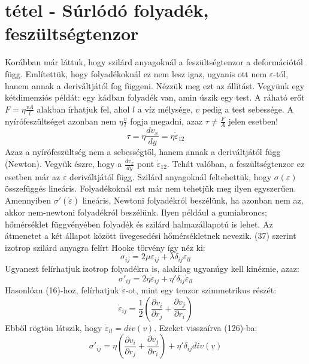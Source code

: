 \documentclass[a4paper,12pt]{article}
\begin{document}
\section{tétel - Súrlódó folyadék, feszültségtenzor}
Korábban már láttuk, hogy szilárd anyagoknál a feszültségtenzor a deformációtól függ. Említettük, hogy folyadékoknál ez nem lesz igaz, ugyanis ott nem $\varepsilon$-tól, hanem annak a deriváltjától fog függeni. Nézzük meg ezt az állítást.
Vegyünk egy kétdimenziós példát: egy kádban folyadék van, amin úszik egy test. A ráható erőt $F=\eta\frac{vA}{l}$ alakban írhatjuk fel, ahol $l$ a víz mélysége, $v$ pedig a test sebessége. A nyírófeszültséget azonban nem $\eta\frac{v}{l}$ fogja megadni, azaz $\tau\neq\frac{F}{A}$ jelen esetben!
\begin{equation}
\tau=\eta\frac{dv_x}{dy}=\eta\dot{\varepsilon}_{12}
\end{equation}
Azaz a nyírófeszültség nem a sebességtől, hanem annak a deriváltjától függ (Newton). Vegyük észre, hogy a $\frac{dv_x}{dy}$ pont $\dot{\varepsilon}_{12}$. Tehát valóban, a feszültségtenzor ez esetben már az $\varepsilon$ deriváltjától függ.
Szilárd anyagoknál feltehettük, hogy $\sigma(\varepsilon)$ összefüggés lineáris. Folyadékoknál ezt már nem tehetjük meg ilyen egyszerűen. Amennyiben $\sigma'(\dot{\varepsilon})$ lineáris, Newtoni folyadékról beszélünk, ha azonban nem az, akkor nem-newtoni folyadékról beszélünk. Ilyen például a gumiabroncs; hőmérséklet függvényében folyadék és szilárd halmazállapotú is lehet. Az átmenetet a két állapot között üvegesedési hőmérsékletnek nevezik.
(37) szerint izotrop szilárd anyagra felírt Hooke törvény így néz ki:
\begin{equation}
\sigma_{ij}=2\mu\varepsilon_{ij}+\lambda\delta_{ij}\varepsilon_{ll}
\end{equation}
Ugyanezt felírhatjuk izotrop folyadékra is, alakilag ugyanúgy kell kinéznie, azaz:
\begin{equation}
\sigma'_{ij}=2\eta\dot{\varepsilon}_{ij}+\eta'\delta_{ij}\dot{\varepsilon}_{ll}
\end{equation}
Hasonlóan (16)-hoz, felírhatjuk $\dot{\varepsilon}$-ot, mint egy tenzor szimmetrikus részét:
\begin{equation}
\dot{\varepsilon}_{ij}=\frac{1}{2}\left(\frac{\partial v_i}{\partial r_j}+\frac{\partial v_j}{\partial r_i}\right)
\end{equation}
Ebből rögtön látszik, hogy $\dot{\varepsilon}_{ll}=div(\underline{v})$.
Ezeket visszaírva (126)-ba:
\begin{equation}
\sigma'_{ij}=\eta\left(\frac{\partial v_i}{\partial r_j}+\frac{\partial v_j}{\partial r_i}\right)+\eta'\delta_{ij}div(\underline{v})
\end{equation}
\end{document}
